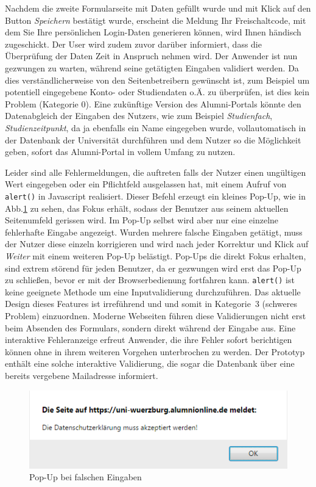 {Nachdem die zweite Formularseite mit Daten gefüllt wurde und mit Klick auf den Button \emph{Speichern} bestätigt wurde, erscheint die Meldung \glqq Ihr Freischaltcode, mit dem Sie Ihre persönlichen Login-Daten generieren können, wird Ihnen händisch zugeschickt\grqq. Der User wird zudem zuvor darüber informiert, dass die Überprüfung der Daten Zeit in Anspruch nehmen wird.
}
{Der Anwender ist nun gezwungen zu warten, während seine getätigten Eingaben validiert werden. Da dies verständlicherweise von den Seitenbetreibern ge\-wünscht ist, zum Beispiel um potentiell eingegebene Konto- oder Studiendaten o.Ä. zu überprüfen, ist dies kein Problem (Kategorie 0). 
}
{Eine zukünftige Version des Alumni-Portals könnte den Datenabgleich der Eingaben des Nutzers, wie zum Beispiel \emph{Studienfach}, \emph{Studienzeitpunkt}, da ja ebenfalls ein Name eingegeben wurde, vollautomatisch in der Datenbank der Universität durchführen und dem Nutzer so die Möglichkeit geben, sofort das Alumni-Portal in vollem Umfang zu nutzen.
}
\label{prob:reg:wartezeit}

{Leider sind alle Fehlermeldungen, die auftreten falls der Nutzer einen ungültigen Wert eingegeben oder ein Pflichtfeld ausgelassen hat, mit einem Aufruf von \texttt{alert()} in Javascript realisiert. Dieser Befehl erzeugt ein kleines Pop-Up, wie in Abb.\ref{fig:regpopup} zu sehen, das Fokus erhält, sodass der Benutzer aus seinem aktuellen Seitenumfeld gerissen wird. Im Pop-Up selbst wird aber nur eine einzelne fehlerhafte Eingabe angezeigt. Wurden mehrere falsche Eingaben getätigt, muss der Nutzer diese einzeln korrigieren und wird nach jeder Korrektur und Klick auf \emph{Weiter} mit einem weiteren Pop-Up belästigt.
}
{Pop-Ups die direkt Fokus erhalten, sind extrem störend für jeden Benutzer, da er gezwungen wird erst das Pop-Up zu schließen, bevor er mit der Browserbedienung fortfahren kann. \texttt{alert()} ist keine geeignete Methode um eine Inputvalidierung durchzuführen. Das aktuelle Design dieses Features ist irreführend und und somit in Kategorie~3 (schweres Problem) einzuordnen.
}
{Moderne Webseiten führen diese Validierungen nicht erst beim Absenden des Formulars, sondern direkt während der Eingabe aus. Eine interaktive Fehleranzeige erfreut Anwender, die ihre Fehler sofort berichtigen können ohne in ihrem weiteren Vorgehen unterbrochen zu werden. Der Prototyp enthält eine solche interaktive Validierung, die sogar die Datenbank über eine bereits vergebene Mailadresse informiert.}
\begin{figure}
	\centering
		\includegraphics{figures/regpopup.png}
	\caption{Pop-Up bei falschen Eingaben}
	\label{fig:regpopup}
\end{figure}

